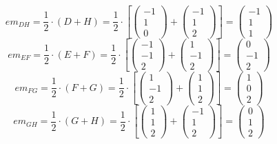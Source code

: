 \documentclass{article}
\begin{document}
\[em_{DH}=\frac{1}{2}\cdot(D+H)=\frac{1}{2}\cdot\left[
\left({\begin{array}{c} -1 \\  1 \\ 0 \end{array}}\right)+
\left({\begin{array}{c} -1 \\  1 \\ 2 \end{array}}\right)\right]=
\left({\begin{array}{c} -1 \\ 1 \\ 1 \end{array}}\right)
\]
\[em_{EF}=\frac{1}{2}\cdot(E+F)=\frac{1}{2}\cdot\left[
\left({\begin{array}{c} -1 \\  -1 \\ 2 \end{array}}\right)+
\left({\begin{array}{c} 1 \\  -1 \\ 2 \end{array}}\right)\right]=
\left({\begin{array}{c} 0 \\ -1 \\ 2 \end{array}}\right)
\]
\[em_{FG}=\frac{1}{2}\cdot(F+G)=\frac{1}{2}\cdot\left[
\left({\begin{array}{c} 1 \\  -1 \\ 2 \end{array}}\right)+
\left({\begin{array}{c} 1 \\  1 \\ 2 \end{array}}\right)\right]=
\left({\begin{array}{c} 1 \\ 0 \\ 2 \end{array}}\right)
\]
\[em_{GH}=\frac{1}{2}\cdot(G+H)=\frac{1}{2}\cdot\left[
\left({\begin{array}{c} 1 \\  1 \\ 2 \end{array}}\right)+
\left({\begin{array}{c} -1 \\  1 \\ 2 \end{array}}\right)\right]=
\left({\begin{array}{c} 0 \\ 1 \\ 2 \end{array}}\right)
\]
\end{document}
